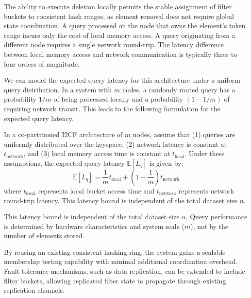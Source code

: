 The ability to execute deletion locally permits the stable assignment of filter buckets to consistent hash ranges, as element removal does not require global state coordination. A query processed on the node that owns the element's token range incurs only the cost of local memory access. A query originating from a different node requires a single network round-trip. The latency difference between local memory access and network communication is typically three to four orders of magnitude.

We can model the expected query latency for this architecture under a uniform query distribution. In a system with $m$ nodes, a randomly routed query has a probability $1/m$ of being processed locally and a probability $(1 - 1/m)$ of requiring network transit. This leads to the following formulation for the expected query latency.

\begin{theorem} \label{thm:co-partitioned-latency}
    In a co-partitioned I2CF architecture of $m$ nodes, assume that (1) queries are uniformly distributed over the keyspace, (2) network latency is constant at $t_{\text{network}}$, and (3) local memory access time is constant at $t_{\text{local}}$. Under these assumptions, the expected query latency $\mathbb{E}[L_q]$ is given by:
    \begin{equation*}
        \mathbb{E}[L_q] = \frac{1}{m} t_{\text{local}} + \left(1 - \frac{1}{m}\right) t_{\text{network}}
    \end{equation*}
    where $t_{\text{local}}$ represents local bucket access time and $t_{\text{network}}$ represents network round-trip latency. This latency bound is independent of the total dataset size $n$.
\end{theorem}

This latency bound is independent of the total dataset size $n$. Query performance is determined by hardware characteristics and system scale ($m$), not by the number of elements stored.

By reusing an existing consistent hashing ring, the system gains a scalable membership testing capability with minimal additional coordination overhead. Fault tolerance mechanisms, such as data replication, can be extended to include filter buckets, allowing replicated filter state to propagate through existing replication channels.


